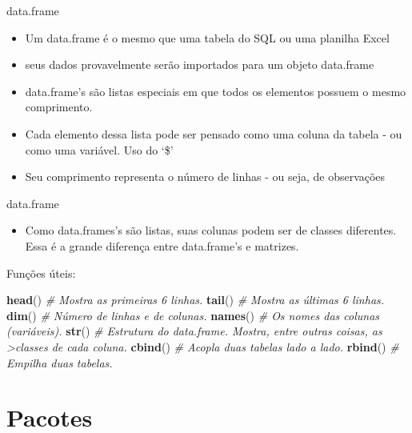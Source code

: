 \documentclass[
  10pt,
  ignorenonframetext,
]{beamer}
\newenvironment{Shaded}{\begin{snugshade}}{\end{snugshade}}
\newcommand{\CommentTok}[1]{\textcolor[rgb]{0.56,0.35,0.01}{\textit{#1}}}
\newcommand{\KeywordTok}[1]{\textcolor[rgb]{0.13,0.29,0.53}{\textbf{#1}}}
\newcommand{\NormalTok}[1]{#1}
\providecommand{\tightlist}{%
  \setlength{\itemsep}{0pt}\setlength{\parskip}{0pt}}
\begin{document}
\begin{frame}{data.frame}
\protect\hypertarget{data.frame-1}{}
\begin{itemize}
\item
  Um data.frame é o mesmo que uma tabela do SQL ou uma planilha Excel
\item
  seus dados provavelmente serão importados para um objeto data.frame
\item
  data.frame's são listas especiais em que todos os elementos possuem o
  mesmo comprimento.
\item
  Cada elemento dessa lista pode ser pensado como uma coluna da tabela -
  ou como uma variável. Uso do `\$'
\item
  Seu comprimento representa o número de linhas - ou seja, de
  observações
\end{itemize}
\end{frame}

\begin{frame}[fragile]{data.frame}
\protect\hypertarget{data.frame-2}{}
\begin{itemize}
\tightlist
\item
  Como data.frames's são listas, suas colunas podem ser de classes
  diferentes. Essa é a grande diferença entre data.frame's e matrizes.
\end{itemize}

Funções úteis:

\begin{Shaded}
\begin{Highlighting}[]
\KeywordTok{head}\NormalTok{() }\CommentTok{\# Mostra as primeiras 6 linhas.}
\KeywordTok{tail}\NormalTok{() }\CommentTok{\# Mostra as últimas 6 linhas.}
\KeywordTok{dim}\NormalTok{() }\CommentTok{\# Número de linhas e de colunas.}
\KeywordTok{names}\NormalTok{() }\CommentTok{\# Os nomes das colunas (variáveis).}
\KeywordTok{str}\NormalTok{() }\CommentTok{\# Estrutura do data.frame. Mostra, entre outras coisas, as \textgreater{}classes de cada coluna.}
\KeywordTok{cbind}\NormalTok{() }\CommentTok{\# Acopla duas tabelas lado a lado.}
\KeywordTok{rbind}\NormalTok{() }\CommentTok{\# Empilha duas tabelas.}
\end{Highlighting}
\end{Shaded}
\end{frame}

\hypertarget{pacotes}{%
\section{Pacotes}\label{pacotes}}
\end{document}
